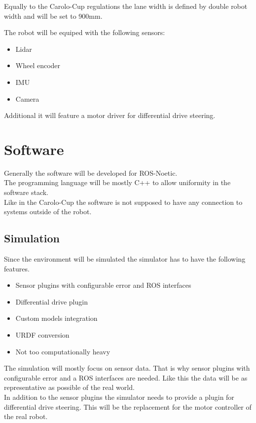 Equally to the Carolo-Cup regulations the lane width is defined by double robot width and will be set to 900mm. 

The robot will be equiped with the following sensors:

\begin{itemize}
	\item Lidar
	\item Wheel encoder
	\item IMU
	\item Camera
\end{itemize}

Additional it will feature a motor driver for differential drive steering.

\section{Software}
Generally the software will be developed for ROS-Noetic.\\
The programming language will be mostly C++ to allow uniformity in the software stack.\\
Like in the Carolo-Cup the software is not supposed to have any connection to systems outside of the robot.\\

\subsection{Simulation}
Since the environment will be simulated the simulator has to have the following features.
\begin{itemize}
	\item Sensor plugins with configurable error and ROS interfaces
	\item Differential drive plugin
	\item Custom models integration
	\item URDF conversion
	\item Not too computationally heavy
\end{itemize}

The simulation will mostly focus on sensor data. That is why sensor plugins with configurable error and a ROS interfaces are needed. Like this the data will be as representative as possible of the real world.\\

In addition to the sensor plugins the simulator needs to provide a plugin for differential drive steering. This will be the replacement for the motor controller of the real robot.\\

